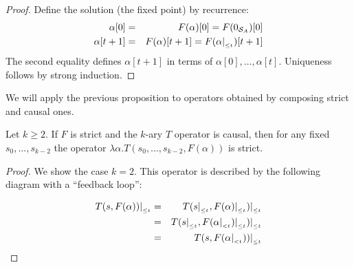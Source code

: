 \begin{proof}
Define the solution (the fixed point) by recurrence:
\begin{eqnarray*}
\alpha[0] & = &  F(\alpha)[0]=F(0_{\mathcal{S}_{A}})[0]\\
\alpha[t+1] & = & F(\alpha)[t+1]=F(\alpha|_{_{\leq t}})[t+1]
\end{eqnarray*}
The second equality defines $\alpha[t+1]$ in terms of $\alpha[0],\ldots,\alpha[t]$.
Uniqueness follows by strong induction.

\qquad
\end{proof}

We will apply the previous proposition to operators obtained by composing strict and causal ones.
\begin{lemma} 
\label{lemma-causal-strict}
Let $k\geq 2$. If $F$ is strict and the $k$-ary $T$ operator is causal, then for any 
fixed $s_0,\ldots,s_{k-2}$ the operator
$\lambda\alpha.T(s_0,\ldots,s_{k-2},F(\alpha))$ is strict. 
\end{lemma}

\begin{proof} We show the case $k=2$.
This operator is described by the following diagram with a ``feedback loop'':

\begin{center}
\end{center}
\begin{eqnarray*}
T(s,F(\alpha))|_{_{\leq t}} & = & T(s|_{_{\leq t}},F(\alpha)|_{_{\leq t}})|_{_{\leq t}}\\
                   & = & T(s|_{_{\leq t}},F(\alpha|_{_{< t}})|_{_{\leq t}})|_{_{\leq t}}\\
                   & = & T(s,F(\alpha|_{_{< t}}))|_{_{\leq t}}
\end{eqnarray*}
\qquad
\end{proof}


